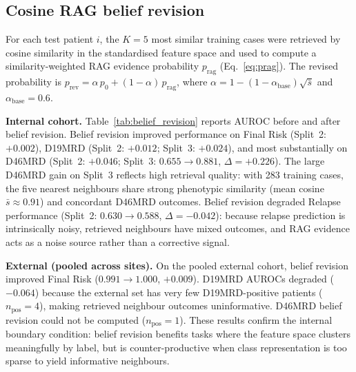 \documentclass[pdflatex,sn-nature]{sn-jnl}
\begin{document}
\subsection{Cosine RAG belief revision}
\label{sec:rag}

For each test patient $i$, the $K=5$ most similar training cases were
retrieved by cosine similarity in the standardised feature space and
used to compute a similarity-weighted RAG evidence probability
$p_\text{rag}$ (Eq.~\ref{eq:prag}).
The revised probability is
$p_\text{rev} = \alpha\,p_0 + (1-\alpha)\,p_\text{rag}$, where
$\alpha = 1-(1-\alpha_\text{base})\sqrt{\bar{s}}$ and
$\alpha_\text{base}=0.6$.

\textbf{Internal cohort.}
Table~\ref{tab:belief_revision} reports AUROC before and after belief
revision.
Belief revision improved performance on Final Risk (Split~2:
$+0.002$), D19MRD (Split~2: $+0.012$; Split~3: $+0.024$), and most
substantially on D46MRD (Split~2: $+0.046$; Split~3: $0.655 \to 0.881$,
$\Delta=+0.226$).
The large D46MRD gain on Split~3 reflects high retrieval quality: with
283 training cases, the five nearest neighbours share strong
phenotypic similarity (mean cosine $\bar{s} \approx 0.91$) and
concordant D46MRD outcomes.
Belief revision degraded Relapse performance (Split~2:
$0.630 \to 0.588$, $\Delta=-0.042$): because relapse prediction is
intrinsically noisy, retrieved neighbours have mixed outcomes, and
RAG evidence acts as a noise source rather than a corrective signal.

\textbf{External (pooled across sites).}
On the pooled external cohort, belief revision improved Final Risk
($0.991 \to 1.000$, $+0.009$).
D19MRD AUROCs degraded ($-0.064$) because the external set has very
few D19MRD-positive patients ($n_\text{pos}=4$), making retrieved
neighbour outcomes uninformative.
D46MRD belief revision could not be computed ($n_\text{pos}=1$).
These results confirm the internal boundary condition: belief revision
benefits tasks where the feature space clusters meaningfully by label,
but is counter-productive when class representation is too sparse to
yield informative neighbours.
\end{document}
